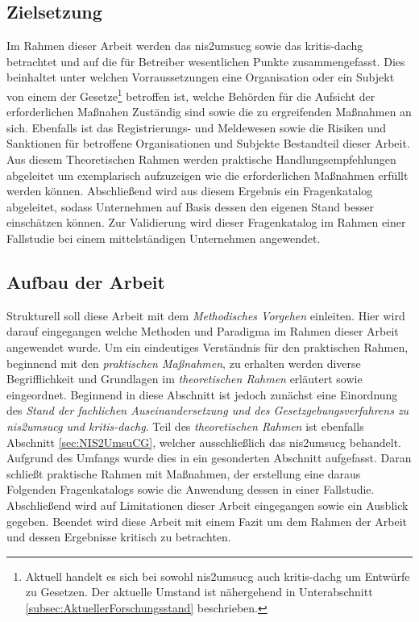 \documentclass[11pt,a4paper,hidelinks]{article}   %
\begin{document}
    \subsection{Zielsetzung}
        Im Rahmen dieser Arbeit werden das \gls{nis2umsucg} sowie das \gls{kritis-dachg} betrachtet und auf die für Betreiber wesentlichen Punkte zusammengefasst. Dies beinhaltet unter welchen Vorraussetzungen eine Organisation oder ein Subjekt von einem der Gesetze\footnote{Aktuell handelt es sich bei sowohl \gls{nis2umsucg} auch \gls{kritis-dachg} um Entwürfe zu Gesetzen. Der aktuelle Umstand ist nähergehend in Unterabschnitt \ref{subsec:AktuellerForschungsstand} beschrieben.} betroffen ist, welche Behörden für die Aufsicht der erforderlichen Maßnahen Zuständig sind sowie die zu ergreifenden Maßnahmen an sich. Ebenfalls ist das Registrierungs- und Meldewesen sowie die Risiken und Sanktionen für betroffene Organisationen und Subjekte Bestandteil dieser Arbeit. Aus diesem Theoretischen Rahmen werden praktische Handlungsempfehlungen abgeleitet um exemplarisch aufzuzeigen wie die erforderlichen Maßnahmen erfüllt werden können. Abschließend wird aus diesem Ergebnis ein Fragenkatalog abgeleitet, sodass Unternehmen auf Basis dessen den eigenen Stand besser einschätzen können. Zur Validierung wird dieser Fragenkatalog im Rahmen einer Fallstudie bei einem mittelständigen Unternehmen angewendet.
    \subsection{Aufbau der Arbeit}
        Strukturell soll diese Arbeit mit dem \emph{Methodisches Vorgehen} einleiten. Hier wird darauf eingegangen welche Methoden und Paradigma im Rahmen dieser Arbeit angewendet wurde. Um ein eindeutiges Verständnis für den praktischen Rahmen, beginnend mit den \emph{praktischen Maßnahmen}, zu erhalten werden diverse Begrifflichkeit und Grundlagen im \emph{theoretischen Rahmen} erläutert sowie eingeordnet. Beginnend in diese Abschnitt ist jedoch zunächst eine Einordnung des \emph{Stand der fachlichen Auseinandersetzung und des Gesetzgebungsverfahrens zu \gls{nis2umsucg} und \gls{kritis-dachg}}. Teil des \emph{theoretischen Rahmen} ist ebenfalls Abschnitt \ref{sec:NIS2UmsuCG}, welcher ausschließlich das \gls{nis2umsucg} behandelt. Aufgrund des Umfangs wurde dies in ein gesonderten Abschnitt aufgefasst. Daran schließt praktische Rahmen mit Maßnahmen, der erstellung eine daraus Folgenden Fragenkatalogs sowie die Anwendung dessen in einer Fallstudie. Abschließend wird auf Limitationen dieser Arbeit eingegangen sowie ein Ausblick gegeben. Beendet wird diese Arbeit mit einem Fazit um dem Rahmen der Arbeit und dessen Ergebnisse kritisch zu betrachten. 
\end{document}
